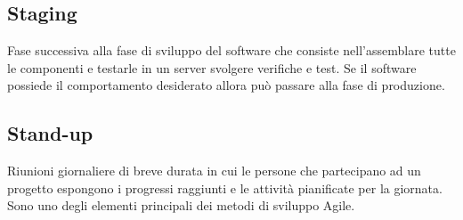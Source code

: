 \subsection*{Staging}
Fase successiva alla fase di sviluppo del software che consiste nell'assemblare tutte le componenti e testarle in un server svolgere verifiche e test. Se il software possiede il comportamento desiderato allora può passare alla fase di produzione.

\subsection*{Stand-up}
Riunioni giornaliere di breve durata in cui le persone che partecipano ad un progetto espongono i progressi raggiunti e le attività pianificate per la giornata. Sono uno degli elementi principali dei metodi di sviluppo Agile\glo. 

